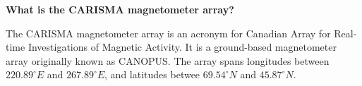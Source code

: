 \textbf{What is the CARISMA magnetometer array?}

The CARISMA magnetometer array is an acronym for Canadian Array for Real-time
Investigations of Magnetic Activity. It is a ground-based magnetometer
array originally known as CANOPUS. The array spans longitudes between
$220.89^{\circ}E$ and $267.89^{\circ}E$, and latitudes betwee
$69.54^{\circ}N$ and $45.87^{\circ}N$.


